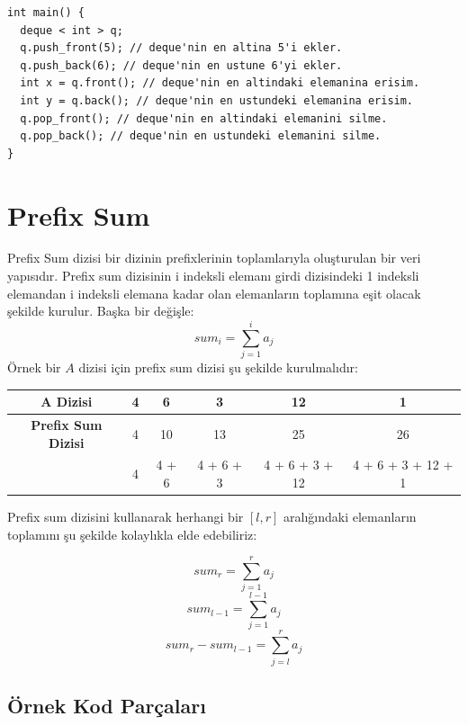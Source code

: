 \documentclass[12pt]{article}
\begin{document}
    \begin{verbatim}
int main() {
  deque < int > q;
  q.push_front(5); // deque'nin en altina 5'i ekler.
  q.push_back(6); // deque'nin en ustune 6'yi ekler.
  int x = q.front(); // deque'nin en altindaki elemanina erisim.
  int y = q.back(); // deque'nin en ustundeki elemanina erisim.
  q.pop_front(); // deque'nin en altindaki elemanini silme.
  q.pop_back(); // deque'nin en ustundeki elemanini silme.
}
    \end{verbatim}
    \cleardoublepage

	\section{Prefix Sum}
	
	Prefix Sum dizisi bir dizinin prefixlerinin toplamlar{\i}yla olu\c{s}turulan bir veri yap{\i}s{\i}d{\i}r. Prefix sum dizisinin i indeksli eleman{\i} girdi dizisindeki 1 indeksli elemandan i indeksli elemana kadar olan elemanlar{\i}n toplam{\i}na e\c{s}it olacak \c{s}ekilde kurulur. Ba\c{s}ka bir de\u{g}i\c{s}le: $$sum_i = \sum_{j=1}^{i} {a_j} $$ \"{O}rnek bir $A$ dizisi i\c{c}in prefix sum dizisi \c{s}u \c{s}ekilde kurulmal{\i}d{\i}r:

    \begin{table}[h]
    \centering
    \begin{tabular}{|c|c|c|c|c|c|}
    \hline
    \textbf{A Dizisi} & 4 & 6 & 3 & 12 & 1 \\ \hline
    \textbf{Prefix Sum Dizisi} & 4 & 10 & 13 & 25 & 26 \\ \hline
     & \cellcolor[HTML]{F8FF00}4 & \cellcolor[HTML]{F8FF00}4 + 6 & \cellcolor[HTML]{F8FF00}4 + 6 + 3 & \cellcolor[HTML]{F8FF00}4 + 6 + 3 + 12 & \cellcolor[HTML]{F8FF00}4 + 6 + 3 + 12 + 1 \\ \hline
    \end{tabular}
    \end{table}

	Prefix sum dizisini kullanarak herhangi bir $[l,r]$ aral{\i}\u{g}{\i}ndaki elemanlar{\i}n toplam{\i}n{\i} \c{s}u \c{s}ekilde kolayl{\i}kla elde edebiliriz:
	
    $$sum_r = \sum_{j=1}^{r} {a_j} $$ 
    $$sum_{l - 1} = \sum_{j=1}^{l - 1} {a_j} $$ 
	$$sum_r - sum_{l-1} = \sum_{j=l}^{r} {a_j}$$
	
	\subsection{\"{O}rnek Kod Par\c{c}alar{\i}}
	
\end{document}

